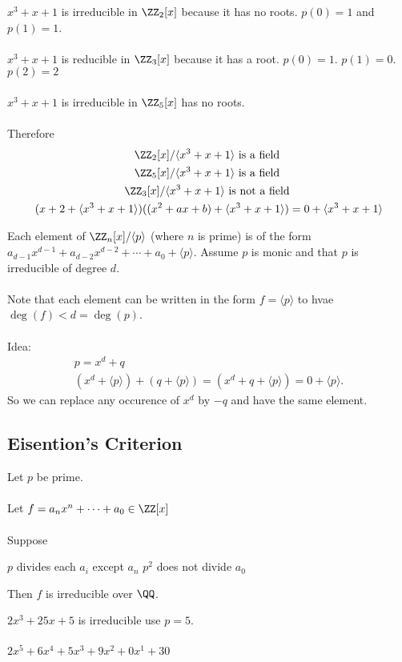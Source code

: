 \documentclass[class=scrartcl, crop=false]{standalone}
\begin{document}
\begin{example}
  $x^3 + x + 1$ is irreducible in $\ZZ_2[x]$ because it has no roots. $p(0) = 1$ and $p(1) = 1$.
  \\\\
  $x^3 + x + 1$ is reducible in $\ZZ_3[x]$ because it has a root. $p(0) = 1$. $p(1) = 0$. $p(2) = 2$ 
  \\\\
  $x^3 + x + 1$ is irreducible in  $\ZZ_5[x]$ has no roots.
  \\\\
  Therefore
  \begin{gather*}
    \ZZ_2[x] / \langle x^3 + x + 1 \rangle \ \text{is a field} \  \\
    \ZZ_5[x] / \langle x^3 + x + 1 \rangle \ \text{is a field} \ \\
    \ZZ_3[x] / \langle x^3 + x + 1 \rangle \ \text{is not a field} \ \\
    (x + 2 + \langle x^3 + x + 1 \rangle )((x^2 + ax + b) + \langle x^3 + x + 1 \rangle ) = 0 + \langle x^3 + x + 1 \rangle 
  \end{gather*} 
\end{example} 

\begin{lemma}
  Each element of $\ZZ_n[x] / \langle p \rangle $ (where $n$ is prime) is of the form $a_{d - 1}x^{d - 1} + a_{d - 2}x^{d - 2} + \cdots + a_0 + \langle p \rangle $. Assume $p$ is monic and that $p$ is irreducible of degree $d$.
  \\\\
  Note that each element can be written in the form  $f = \langle p \rangle $ to hvae $\deg(f) < d = \deg(p)$.
  \\\\
  Idea:
  \begin{gather*}
    p = x^d + q \\
    (x^d + \langle p \rangle ) + (q + \langle p \rangle ) = (x^d + q + \langle p \rangle ) = 0 + \langle p \rangle .
  \end{gather*} 
  So we can replace any occurence of $x^d$ by $-q$ and have the same element.
\end{lemma} 

\subsection{Eisention's Criterion}

Let $p$ be prime. 
\\\\
Let $f = a_n x^n + \cdots + a_0 \in \ZZ[x]$
\\\\
Suppose 
\begin{enumerate}
  \ii
  $p$ divides each $a_i$ except $a_n$ 
  \ii
  $p^2$ does not divide $a_0$
\end{enumerate} 

Then $f$ is irreducible over $\QQ$. 
\begin{example}
  $2x^3 + 25x + 5$ is irreducible use $p = 5$.
  \\\\
  $2x^5 + 6x^4 + 5x^3 + 9x^2 + 0x^1 + 30$
\end{example} 
\end{document}
